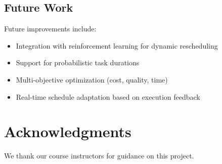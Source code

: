 \documentclass[11pt,a4paper]{article}
\begin{document}
\subsection{Future Work}

Future improvements include:
\begin{itemize}
    \item Integration with reinforcement learning for dynamic rescheduling
    \item Support for probabilistic task durations
    \item Multi-objective optimization (cost, quality, time)
    \item Real-time schedule adaptation based on execution feedback
\end{itemize}

\section*{Acknowledgments}

We thank our course instructors for guidance on this project.



\end{document}
